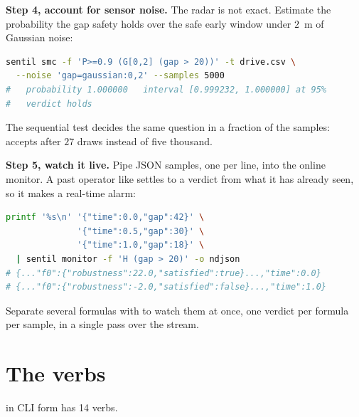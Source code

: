 \textbf{Step 4, account for sensor noise.} The radar is not exact. Estimate the probability the gap safety holds over the safe early window under $2$~m of Gaussian noise:

\begin{lstlisting}[language=bash]
sentil smc -f 'P>=0.9 (G[0,2] (gap > 20))' -t drive.csv \
  --noise 'gap=gaussian:0,2' --samples 5000
#   probability 1.000000   interval [0.999232, 1.000000] at 95%
#   verdict holds
\end{lstlisting}

The sequential test decides the same question in a fraction of the samples:  accepts after $27$ draws instead of five thousand.

\textbf{Step 5, watch it live.} Pipe JSON samples, one per line, into the online monitor. A past operator like  settles to a verdict from what it has already seen, so it makes a real-time alarm:

\begin{lstlisting}[language=bash]
printf '%s\n' '{"time":0.0,"gap":42}' \
              '{"time":0.5,"gap":30}' \
              '{"time":1.0,"gap":18}' \
  | sentil monitor -f 'H (gap > 20)' -o ndjson
# {..."f0":{"robustness":22.0,"satisfied":true}...,"time":0.0}
# {..."f0":{"robustness":-2.0,"satisfied":false}...,"time":1.0}
\end{lstlisting}

Separate several formulas with \code{;} to watch them at once, one verdict per formula per sample, in a single pass over the stream.

\section{The verbs}

\sentil{} in CLI form has 14 verbs.


